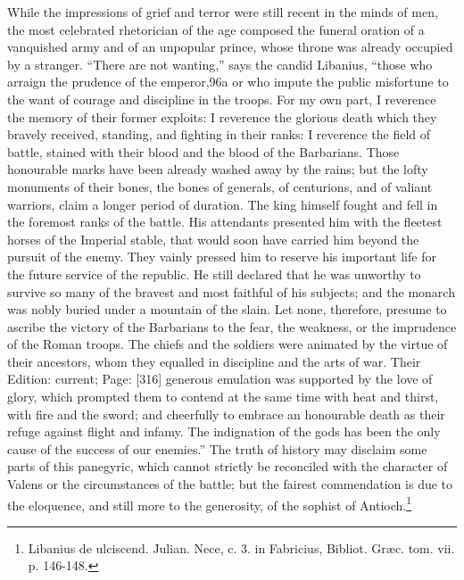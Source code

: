 While the impressions of grief and terror were still recent in the minds of men, the most celebrated rhetorician of the age composed the funeral oration of a vanquished army and of an unpopular prince, whose throne was already occupied by a stranger. \texthebrew{“}There are not wanting,\texthebrew{}” says the candid Libanius, \texthebrew{“}those who arraign the prudence of the emperor,96a or who impute the public misfortune to the want of courage and discipline in the troops. For my own part, I reverence the memory of their former exploits: I reverence the glorious death which they bravely received, standing, and fighting in their ranks: I reverence the field of battle, stained with their blood and the blood of the Barbarians. Those honourable marks have been already washed away by the rains; but the lofty monuments of their bones, the bones of generals, of centurions, and of valiant warriors, claim a longer period of duration. The king himself fought and fell in the foremost ranks of the battle. His attendants presented him with the fleetest horses of the Imperial stable, that would soon have carried him beyond the pursuit of the enemy. They vainly pressed him to reserve his important life for the future service of the republic. He still declared that he was unworthy to survive so many of the bravest and most faithful of his subjects; and the monarch was nobly buried under a mountain of the slain. Let none, therefore, presume to ascribe the victory of the Barbarians to the fear, the weakness, or the imprudence of the Roman troops. The chiefs and the soldiers were animated by the virtue of their ancestors, whom they equalled in discipline and the arts of war. Their Edition: current; Page: [316] generous emulation was supported by the love of glory, which prompted them to contend at the same time with heat and thirst, with fire and the sword; and cheerfully to embrace an honourable death as their refuge against flight and infamy. The indignation of the gods has been the only cause of the success of our enemies.\texthebrew{}” The truth of history may disclaim some parts of this panegyric, which cannot strictly be reconciled with the character of Valens or the circumstances of the battle; but the fairest commendation is due to the eloquence, and still more to the generosity, of the sophist of Antioch.\footnote{Libanius de ulciscend. Julian. Nece, c. 3. in Fabricius, Bibliot. Græc. tom. vii. p. 146-148.}

